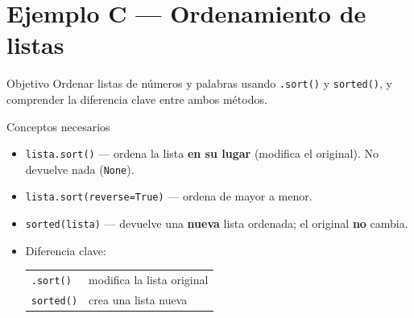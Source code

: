 \documentclass[12pt,a4paper]{article}
\begin{document}
\newpage
\section{Ejemplo C — Ordenamiento de listas}
\label{sec:ejemploC}

\begin{objetivobox}{Objetivo}
Ordenar listas de números y palabras usando \texttt{.sort()} y
\texttt{sorted()}, y comprender la diferencia clave entre ambos métodos.
\end{objetivobox}

\vspace{0.6em}
\begin{conceptobox}{Conceptos necesarios}
\begin{itemize}
  \item \texttt{lista.sort()} — ordena la lista \textbf{en su lugar}
        (modifica el original).  No devuelve nada (\texttt{None}).
  \item \texttt{lista.sort(reverse=True)} — ordena de mayor a menor.
  \item \texttt{sorted(lista)} — devuelve una \textbf{nueva} lista ordenada;
        el original \textbf{no} cambia.
  \item Diferencia clave:
        \begin{center}
        \begin{tabular}{ll}
          \texttt{.sort()} & modifica la lista original \\
          \texttt{sorted()} & crea una lista nueva \\
        \end{tabular}
        \end{center}
\end{itemize}
\end{conceptobox}
\end{document}
